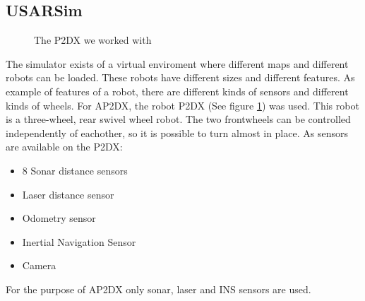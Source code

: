 \documentclass[titlepage, a4paper,10pt]{article}
\begin{document}
\subsection{USARSim}
\begin{figure}[b]
  \centering
  \caption{The P2DX we worked with}
  \label{fig:p2dx}
\end{figure}
The simulator exists of a virtual enviroment where different maps and different
robots can be loaded. These robots have different sizes and different features.
As example of features of a robot, there are different kinds of sensors and
different kinds of wheels. For AP2DX, the robot P2DX (See figure \ref{fig:p2dx}) was used. This robot is a three-wheel, rear swivel wheel robot. The two frontwheels can be controlled independently of eachother, so it is possible to turn almost in place. As sensors are available on the P2DX:
\begin{itemize}
\item 8 Sonar distance sensors
\item Laser distance sensor
\item Odometry sensor
\item Inertial Navigation Sensor
\item Camera
\end{itemize}
For the purpose of AP2DX only sonar, laser and INS sensors are used.
\end{document}
